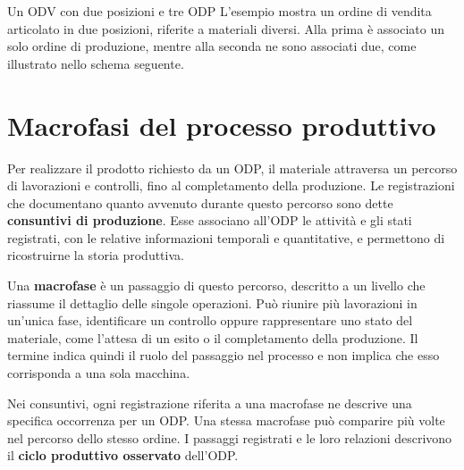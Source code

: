 \begingroup
{}
\begin{examplebox}{Un ODV con due posizioni e tre ODP}
L'esempio mostra un ordine di vendita articolato in due posizioni, riferite a materiali diversi. Alla prima è associato un solo ordine di produzione, mentre alla seconda ne sono associati due, come illustrato nello schema seguente.

\begin{center}

\end{center}
\end{examplebox}
\endgroup

\section{Macrofasi del processo produttivo}
\label{sec:production-phases}

Per realizzare il prodotto richiesto da un ODP, il materiale attraversa un percorso di lavorazioni e controlli, fino al completamento della produzione. Le registrazioni che documentano quanto avvenuto durante questo percorso sono dette \textbf{consuntivi di produzione}. Esse associano all'ODP le attività e gli stati registrati, con le relative informazioni temporali e quantitative, e permettono di ricostruirne la storia produttiva.

Una \textbf{macrofase} è un passaggio di questo percorso, descritto a un livello che riassume il dettaglio delle singole operazioni. Può riunire più lavorazioni in un'unica fase, identificare un controllo oppure rappresentare uno stato del materiale, come l'attesa di un esito o il completamento della produzione. Il termine indica quindi il ruolo del passaggio nel processo e non implica che esso corrisponda a una sola macchina.

Nei consuntivi, ogni registrazione riferita a una macrofase ne descrive una specifica occorrenza per un ODP. Una stessa macrofase può comparire più volte nel percorso dello stesso ordine. I passaggi registrati e le loro relazioni descrivono il \textbf{ciclo produttivo osservato} dell'ODP.

